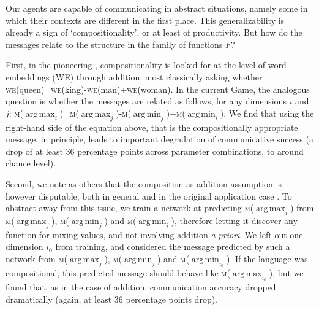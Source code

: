 \documentclass[11pt,a4paper]{article}
\DeclareMathOperator*{\argmax}{arg\,max}
\DeclareMathOperator*{\argmin}{arg\,min}
\newcommand{\nbEC}[1]{{\leavevmode\color{blue}{\scriptsize#1}}}
\begin{document}
Our agents are capable of communicating in abstract situations, namely some in which their contexts are different in the first place. This generalizability is already a sign of `compositionality', or at least of productivity. But how do the messages relate to the structure in the family of functions $F$? 

\newcommand{\WE}[1]{\textsc{we}(#1)}
\newcommand{\MESS}[1]{\textsc{m}(#1)}

First, in the pioneering \citealp{mikolov_efficient_2013}, compositionality is looked for at the level of word embeddings (WE) through addition, most classically asking whether  
\WE{queen}=\WE{king}-\WE{man}+\WE{woman}. In the current Game, the analogous question is whether the messages are related as follows, for any dimensions $i$ and $j$:
\MESS{$\argmax_i$}=\MESS{$\argmax_j$}-\MESS{$\argmin_j$}+\MESS{$\argmin_i$}. We find that using the right-hand side of the equation above, that is the compositionally appropriate message, in principle, leads to important degradation of communicative success (a drop of at least 36 percentage points across parameter combinations, to around chance level).

Second, we note as others that the composition as addition assumption is however disputable, both in general and in the original application case \citep{linzen-2016-issues, Chen2017}. To abstract away from this issue, we train a network at predicting 
\MESS{$\argmax_i$} from \MESS{$\argmax_j$}, \MESS{$\argmin_j$} and \MESS{$\argmin_i$}, therefore letting it discover any function for mixing values, and not involving addition \emph{a priori}. We left out one dimension $i_0$ from training, and considered the message predicted by such a network from \MESS{$\argmax_j$}, \MESS{$\argmin_j$} and \MESS{$\argmin_{i_0}$}. If the language was compositional, this predicted message should behave like \MESS{$\argmax_{i_0}$}, but we found that, as in the case of addition, communication accuracy dropped dramatically (again, at least 36 percentage points drop).
\nbEC{cite Baroni's (or others) similar tests?}


\end{document}
